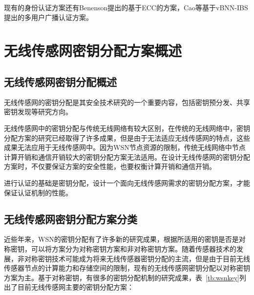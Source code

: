 现有的身份认证方案还有Benenson提出的基于ECC的方案，Cao等基于vBNN-IBS提出的多用户广播认证方案。



\section{无线传感网密钥分配方案概述}

\subsection{无线传感网密钥分配概述}
无线传感网的密钥分配是其安全技术研究的一个重要内容，包括密钥预分发、共享密钥发现等研究方向。

无线传感网中的密钥分配与传统无线网络有较大区别，在传统的无线网络中，密钥分配方案的研究已经取得了许多成果，但是由于无法适应无线传感网的特点，这些成果无法应用于无线传感网中。因为WSN节点资源的限制，传统无线网络中节点计算开销和通信开销较大的密钥分配方案无法适用。在设计无线传感网的密钥分配方案时，不仅要保证方案的安全性能，也要权衡计算开销和通信开销。

进行认证的基础是密钥分配，设计一个面向无线传感网需求的密钥分配方案，才能保证认证机制的性能。
\subsection{无线传感网密钥分配方案分类}
近些年来，WSN的密钥分配有了许多新的研究成果，根据所适用的密钥是否是对称密钥，可以将方案分为对称密钥方案和非对称密钥方案。随着传感器技术的发展，非对称密钥技术可能成为将来无线传感器密钥分配的主流，但是由于目前无线传感器节点的计算能力和存储空间的限制，现有的无线传感网密钥分配以对称密钥方案为主。基于对称密钥，有很多的密钥分配机制的研究成果，表~\ref{tb:wsnkey}列出了目前无线传感网主要的密钥分配方案：


